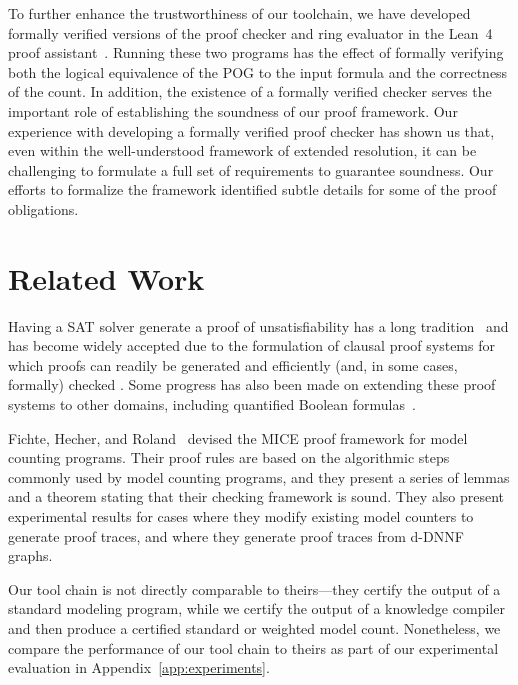 \documentclass[letterpaper,USenglish,cleveref, autoref, thm-restate]{lipics-v2021}
\newcommand{\lean}{Lean~4}
\begin{document}
To further enhance the trustworthiness of our toolchain, we have
developed formally verified versions of the proof checker and ring
evaluator in the \lean{} proof assistant~\cite{demoura:cade:2021}.  Running these two programs
has the effect of formally verifying both the logical equivalence of
the POG to the input formula and the correctness of the count.  In
addition, the existence of a formally verified checker serves the
important role of establishing the soundness of our proof framework.
Our
experience with developing a formally verified proof checker has shown
us that, even within the well-understood framework of extended
resolution, it can be challenging to formulate a full set of requirements to guarantee soundness.
Our efforts to formalize the framework
identified subtle details for some of the proof obligations.

\section{Related Work}

Having a SAT solver generate a proof of unsatisfiability has a long
tradition~\cite{ZhangMalik} and has become widely accepted due to the
formulation of clausal proof systems for which proofs can readily be
generated and efficiently (and, in some cases, formally) checked
\cite{cruz-cade-2017,RAT,Tan:2021,wetzler14_drattrim}.  Some progress
has also been made on extending these proof systems to other domains,
including quantified Boolean
formulas~\cite{bryant:cade:2021,heule:JAR2014}.

Fichte, Hecher, and Roland~\cite{fichte:sat:2022} devised the MICE
proof framework for model counting programs.  Their proof rules are
based on the algorithmic steps commonly used by model counting
programs, and they present a series of lemmas and a theorem stating
that their checking framework is sound.  They also present
experimental results for cases where they modify existing model
counters to generate proof traces, and where they generate proof
traces from d-DNNF graphs.

Our tool chain is not directly
comparable to theirs---they certify the output of a standard modeling
program, while we certify the output of a knowledge compiler and then
produce a certified standard or weighted model count.
Nonetheless,
we compare the performance of our tool chain to theirs as part of our
experimental evaluation in Appendix~\ref{app:experiments}.
\end{document}
